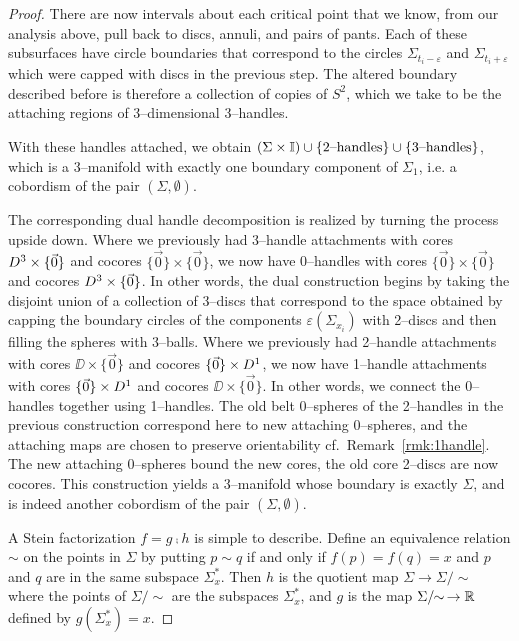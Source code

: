\begin{proof}
	There are now intervals about each critical point that we know, from our analysis above, pull back to discs, annuli, and pairs of pants.
	Each of these subsurfaces have circle boundaries that correspond to the circles $\Sigma_{t_i-\varepsilon}$ and $\Sigma_{t_i+\varepsilon}$ which were capped with discs in the previous step.
	The altered boundary described before is therefore a collection of copies of $S^2$, which we take to be the attaching regions of 3--dimensional 3--handles.
	
	With these handles attached, we obtain $(\Sigma\times\mathbb{I})\cup\{\textrm{2--handles}\}\cup\{\textrm{3--handles}\}$, which is a 3--manifold with exactly one boundary component of $\Sigma_1$, i.e. a cobordism of the pair $(\Sigma,\emptyset)$.
	
	The corresponding dual handle decomposition is realized by turning the process upside down.
	Where we previously had 3--handle attachments with cores $D^3\times\{\vec{0}\}$ and cocores $\{\vec{0}\}\times\{\vec{0}\}$, we now have 0--handles with cores $\{\vec{0}\}\times\{\vec{0}\}$ and cocores $D^3\times\{\vec{0}\}$.
	In other words, the dual construction begins by taking the disjoint union of a collection of 3--discs that correspond to the space obtained by capping the boundary circles of the components $\varepsilon(\Sigma_{x_i})$ with 2--discs and then filling the spheres with 3--balls.
	Where we previously had 2--handle attachments with cores $\DD\times\{\vec{0}\}$ and cocores $\{\vec{0}\}\times D^1$, we now have 1--handle attachments with cores $\{\vec{0}\}\times D^1$ and cocores $\DD\times\{\vec{0}\}$.
	In other words, we connect the 0--handles together using 1--handles.
	The old belt 0--spheres of the 2--handles in the previous construction correspond here to new attaching 0--spheres, and the attaching maps are chosen to preserve orientability cf.\ Remark~\ref{rmk:1handle}.
	The new attaching 0--spheres bound the new cores, the old core 2--discs are now cocores.
	This construction yields a 3--manifold whose boundary is exactly $\Sigma$, and is indeed another cobordism of the pair $(\Sigma,\emptyset)$.
	
	A Stein factorization $f=g\comp h$ is simple to describe.
	Define an equivalence relation $\sim$ on the points in $\Sigma$ by putting $p\sim q$ if and only if $f(p)=f(q)=x$ and $p$ and $q$ are in the same subspace $\Sigma_x^*$.
	Then $h$ is the quotient map $\Sigma\to \Sigma/\!\!\sim$ where the points of $\Sigma/\!\!\sim$ are the subspaces $\Sigma_x^*$, and $g$ is the map $\Sigma/\!\!\sim\, \to\mathbb{R}$ defined by $g(\Sigma_x^*)=x$.


\end{proof}
